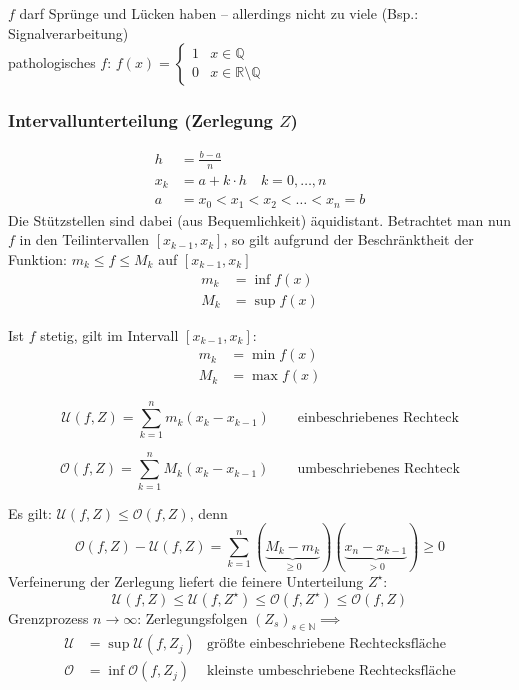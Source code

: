 \noindent \( f \) darf Sprünge und Lücken haben -- allerdings nicht zu viele (Bsp.: Signalverarbeitung) \\
pathologisches \( f \): \( f(x) = \begin{cases}1 & x \in \mathbb{Q} \\ 0 & x \in \mathbb{R} \setminus \mathbb{Q}\end{cases} \)

\subsubsection*{Intervallunterteilung (Zerlegung $Z$)}

\begin{align*}
	h &= \frac{b-a}{n} \\
	x_k &= a+k \cdot h \quad k=0,\ldots,n \\
	a &= x_0<x_1<x_2<\ldots<x_n=b 
\end{align*}
Die Stützstellen sind dabei (aus Bequemlichkeit) äquidistant. Betrachtet man nun \(f\) in den Teilintervallen \( [x_{k-1},x_k] \), so gilt aufgrund der Beschränktheit der Funktion: \( m_k \leq f \leq M_k \) auf \( [x_{k-1},x_k] \)
\begin{align*}
	m_k &= \inf f(x) \\
	M_k &= \sup f(x)
\end{align*}

\begin{note}
	Ist \( f \) stetig, gilt im Intervall \( [x_{k-1},x_k] \):
	\begin{align*}
		m_k &= \min f(x) \\
		M_k &= \max f(x)
	\end{align*}	
\end{note}

\begin{definition}
	\[
		\mathcal U(f, Z)= \sum_{k=1}^nm_k(x_k-x_{k-1}) \qquad \text{einbeschriebenes Rechteck}
	\]
\end{definition}


\begin{definition}
	\[
		\mathcal O(f, Z)= \sum_{k=1}^nM_k(x_k-x_{k-1})  \qquad \text{umbeschriebenes Rechteck}
	\]
\end{definition}

\noindent Es gilt: \( \mathcal U(f,Z) \leq \mathcal O(f,Z) \), denn
	\[ \mathcal O(f,Z)- \mathcal U(f,Z)=\sum_{k=1}^n(\underbrace{M_k-m_k}_{\geq0})(\underbrace{x_n-x_{k-1}}_{>0}) \geq 0 \]
\noindent Verfeinerung der Zerlegung liefert die feinere Unterteilung \( Z^\star \):
	\[ \mathcal U(f,Z) \leq \mathcal U(f, Z^\star) \leq \mathcal O(f,Z^\star) \leq \mathcal O(f,Z) \]
\noindent Grenzprozess \( n \rightarrow \infty \): Zerlegungsfolgen \( (Z_s)_{s\in\mathbb{N}} \implies \) 
	\begin{align*}
		\mathcal U &= \sup \mathcal U(f,Z_j) &\text{größte einbeschriebene Rechtecksfläche}\\
		\mathcal O &= \inf \mathcal O(f,Z_j) &\text{kleinste umbeschriebene Rechtecksfläche}
	\end{align*}

